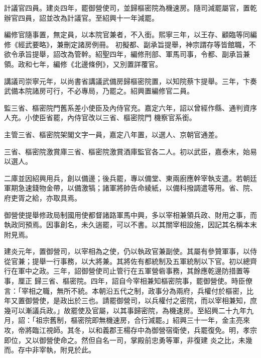 \begin{pinyinscope}
 計議官四員。建炎四年，罷御營使司，並歸樞密院為機速房。隨司減罷屬官，置乾辦官四員，詔並改為計議官。至紹興十一年減罷。



 編修官隨事置，無定員，以本院官兼者，不入銜。熙寧三年，以王存、顧臨等同編修《經武要略》，兼刪定諸房例冊。
 初擬都、副承旨提舉，神宗謂存等皆館職，不欲令承旨提舉，詔改為管幹。紹聖四年，編修刑部、軍馬司事，令都、副承旨兼領。政和七年，編修《北邊條例》，又別置詳覆官。



 講議司崇寧元年，以尚書省講議武備房歸樞密院置，以知院蔡卞提舉。三年，卞奏武備本院諸房可行，不必專局，乃罷之。紹興置編修官二員。



 監三省、樞密院門舊系差小使臣及內侍官充。嘉定六年，詔以曾經作縣、通判資序人充。小使臣省罷，內侍官改以三省、樞密院門
 機察官系銜。



 主管三省、樞密院架閣文字一員，嘉定八年置，以選人、京朝官通差。



 三省、樞密院激賞庫三省、樞密院激賞酒庫監官各二人。初以武臣，嘉泰末，始易以選人。



 二庫並因紹興用兵，創以備邊；後兵罷，專以備堂、東兩廚應幹宰執支遣。若朝廷軍期急速錢物金帶，以備激犒；諸軍將帥告命綾紙，以備科撥調遣等用。省、院、府吏胥之給，亦取具焉。



 御營使提舉修政局制國用使都督諸路軍馬中興，多以宰相兼領兵政、財用之事，而執政同預焉。因事創名，未久遄罷，可以不書。以其關宰相設施，因記其名稱本末附見焉。



 建炎元年，置御營司，以宰相為之使，仍以執政官兼副使。其屬有參贊軍事，以侍從官兼；提舉一行事務，以大將兼。其將佐有都統制及五軍統制以下官。初以總齊行在軍中之政。三年，詔御營使司止管行在五軍營砦事務，其餘應乾邊防措置等事，厘正
 歸三省、樞密院。四年，詔自今宰相兼知樞密院事，罷御營使。時臣僚言：「宰相之職，無所不統。本朝沿五代之制，政事分為兩府，兵權付於樞密，比年又置御營使，是政出於三也。請罷御營司，以兵權付之密院，而以宰相兼知，庶幾可以漸議兵政。」故罷使及官屬，以其事歸密院，為機速房。至紹興二十九年九月，詔：「祖宗舊制，樞密院即無機速房，合行減罷。」紹興三十一年，金主亮來攻，帝將臨江視師。其冬，以和義郡王楊存中為御營宿衛使，兵罷復免。明，孝宗即位，又以御營使命之。然但自名一司，掌殿前忠勇等軍，非復建
 炎之比，未幾而。存中非宰執，附見於此。




\end{pinyinscope}
